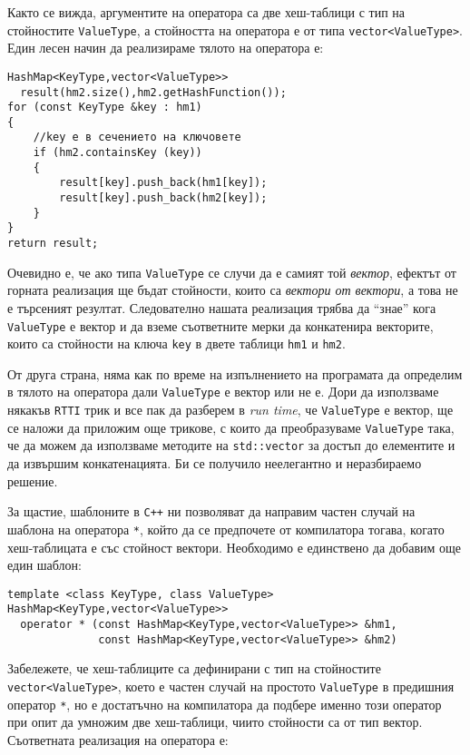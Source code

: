 \documentclass[12pt,a4paper]{article}
\begin{document}
\begin{enumerate}
\begin{mdframed}[hidealllines=true,backgroundcolor=gray!20]
	Както се вижда, аргументите на оператора са две хеш-таблици с тип на стойностите \texttt{ValueType}, а стойността на оператора е от типа \texttt{vector<ValueType>}. Един лесен начин да реализираме тялото на оператора е:
	\\


\begin{verbatim}
HashMap<KeyType,vector<ValueType>> 
  result(hm2.size(),hm2.getHashFunction());
for (const KeyType &key : hm1)
{
    //key е в сечението на ключовете
    if (hm2.containsKey (key))
    {
        result[key].push_back(hm1[key]);
        result[key].push_back(hm2[key]);
    }
}
return result;

\end{verbatim}

	Очевидно е, че ако типа \texttt{ValueType} се случи да е самият той \emph{вектор}, ефектът от горната реализация ще бъдат стойности, които са \emph{вектори от вектори}, а това не е търсеният резултат. Следователно нашата реализация трябва да ``знае'' кога \texttt{ValueType} е вектор и да вземе съответните мерки да конкатенира векторите, които са стойности на ключа \texttt{key} в двете таблици \texttt{hm1} и \texttt{hm2}.

	От друга страна, няма как по време на изпълнението на програмата да определим в тялото на оператора дали \texttt{ValueType} е вектор или не е. Дори да използваме някакъв \texttt{RTTI} трик и все пак да разберем в \emph{run time}, че \texttt{ValueType} е вектор, ще се наложи да приложим още трикове, с които да преобразуваме \texttt{ValueType} така, че да можем да използваме методите на \texttt{std::vector} за достъп до елементите и да извършим конкатенацията. Би се получило неелегантно и неразбираемо решение.

	За щастие, шаблоните в \texttt{C++} ни позволяват да направим частен случай на шаблона на оператора \texttt{*}, който да се предпочете от компилатора тогава, когато хеш-таблицата е със стойност вектори. Необходимо е единствено да добавим още един шаблон:

\begin{verbatim}
template <class KeyType, class ValueType>
HashMap<KeyType,vector<ValueType>> 
  operator * (const HashMap<KeyType,vector<ValueType>> &hm1,
              const HashMap<KeyType,vector<ValueType>> &hm2)
\end{verbatim}


	Забележете, че хеш-таблиците са дефинирани с тип на стойностите \texttt{vector<ValueType>}, което е частен случай на простото \texttt{ValueType} в предишния оператор \texttt{*}, но е достатъчно на компилатора да подбере именно този оператор при опит да умножим две хеш-таблици, чиито стойности са от тип вектор. Съответната реализация на оператора е:
	\\
	\\


\end{mdframed}
\end{enumerate}
\end{document}
